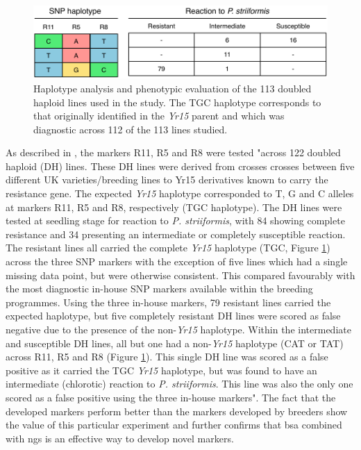 \begin{figure}
\includegraphics[width=1\textwidth]{Yr15/Figures/breedersTest.pdf}
\caption{Haplotype analysis and phenotypic evaluation of the 113 doubled haploid lines used in the study. The TGC haplotype corresponds to that originally identified in the \textit{Yr15} parent and which was diagnostic across 112 of the 113 lines studied.}
\label{fig:yr15:breeders}
\end{figure}

As described in \citet{Ramirez-Gonzalez2015b}, the markers
 R11, R5 and R8 were tested "across 122 doubled haploid (DH) lines. 
These DH lines were derived from crosses crosses between five different UK varieties/breeding lines to Yr15 derivatives known to carry the resistance gene. 
The expected \textit{Yr15} haplotype corresponded to T, G and C alleles at markers R11, R5 and R8, respectively (TGC haplotype). 
The DH lines were tested at seedling stage for reaction to \textit{P. striiformis}, with 84 showing complete resistance and 34 presenting an intermediate or completely susceptible reaction.
The resistant lines all carried the complete \textit{Yr15} haplotype (TGC, Figure \ref{fig:yr15:breeders}) across the three SNP markers with the exception of five lines which had a single missing data point, but were otherwise consistent. 
This compared favourably with the most diagnostic in-house SNP markers available within the breeding programmes. 
Using the three in-house markers, 79 resistant lines carried the expected haplotype, but five completely resistant DH lines were scored as false negative due to the presence of the non-\textit{Yr15} haplotype. 
Within the intermediate and susceptible DH lines, all but one had a non-\textit{Yr15} haplotype (CAT or TAT) across R11, R5 and R8 (Figure \ref{fig:yr15:breeders}). This single DH line was scored as a false positive as it carried the TGC \textit{Yr15} haplotype, but was found to have an intermediate (chlorotic) reaction to \textit{P. striiformis}. This line was also the only one scored as a false positive using the three in-house markers".
The fact that the developed markers perform better than the markers developed by breeders show the value of this particular experiment and further confirms that \acrshort{bsa} combined with \acrshort{ngs} is an effective way to develop novel markers. 
